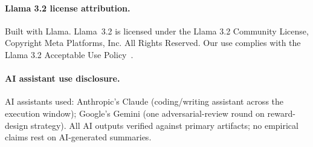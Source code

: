 \documentclass{article}
\begin{document}

\paragraph{Llama 3.2 license attribution.}
Built with Llama. Llama~3.2 is licensed under the Llama 3.2 Community License, Copyright \textcopyright{} Meta Platforms, Inc. All Rights Reserved. Our use complies with the Llama 3.2 Acceptable Use Policy~\citep{meta2024llama3_2_aup}.

\paragraph{AI assistant use disclosure.}
AI assistants used: Anthropic's Claude (coding/writing assistant across the execution window); Google's Gemini (one adversarial-review round on reward-design strategy). All AI outputs verified against primary artifacts; no empirical claims rest on AI-generated summaries.

\end{document}

